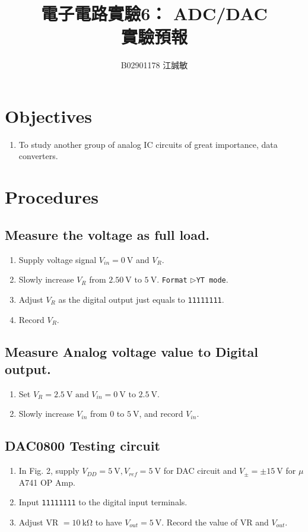 \documentclass[12pt, a4paper]{article}
\title{ \bf {\huge 電子電路實驗6： ADC/DAC}\\ 實驗預報}
\author{B02901178 江誠敏}
\newcommand{\tri}{$\rhd$}
\begin{document}
\maketitle

\section{Objectives}
\begin{enumerate}
  \item To study another group of analog IC circuits 
    of great importance, data converters. 
\end{enumerate}


\section{Procedures}
\subsection{Measure the voltage as full load.}
\begin{enumerate}[itemsep=0pt]
  \item Supply voltage signal $V_{in} = \SI{0}\V$ and $V_R$.
  \item Slowly increase $V_R$ from $2.5\SI{0}\V \text{ to } \SI{5}\V$.
    \texttt{Format} \tri \texttt{YT mode}.
  \item Adjust $V_R$ as the digital output just equals to \texttt{11111111}.
  \item Record $V_R$.
\end{enumerate}

\subsection{Measure Analog voltage value to Digital output.}
\begin{enumerate}[itemsep=0pt]
  \item Set $V_R = \SI{2.5}\V \text{ and } V_{in} = \SI{0}\V \text{ to } \SI{2.5}\V$.
  \item Slowly increase $V_{in}$ from $0$ to $\SI{5}\V$, and record 
    $V_{in}$.
\end{enumerate}

\subsection{DAC0800 Testing circuit}

\begin{enumerate}[itemsep=0pt]
  \item In Fig. 2, supply $V_{DD} = \SI{5}\V, V_{ref} = \SI{5}\V$ for
    DAC circuit and $V_{\pm} = \pm\SI{15}\V$ for $\mu$A741 OP Amp.
  \item Input \texttt{11111111} to the digital input terminals.
  \item Adjust VR $ = \SI{10}\kohm$ to have $V_{out} = \SI{5}\V$.
    Record the value of VR and $V_{out}$.
\end{enumerate}
\end{document}
